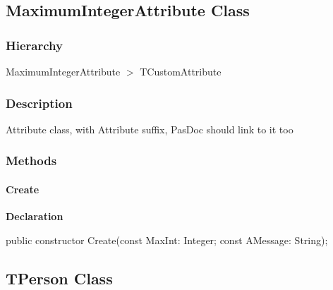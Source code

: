 \documentclass{report}
\newif\ifpdf
\begin{document}
\subsection*{MaximumIntegerAttribute Class}
\fi
\label{ok_attributes.MaximumIntegerAttribute}
\subsubsection*{\large{\textbf{Hierarchy}}\normalsize\hspace{1ex}\hfill}
MaximumIntegerAttribute {$>$} TCustomAttribute
\subsubsection*{\large{\textbf{Description}}\normalsize\hspace{1ex}\hfill}
Attribute class, with Attribute suffix, PasDoc should link to it too\subsubsection*{\large{\textbf{Methods}}\normalsize\hspace{1ex}\hfill}
\paragraph*{Create}\hspace*{\fill}

\label{ok_attributes.MaximumIntegerAttribute-Create}
\begin{list}{}{
\setlength{\itemindent}{0cm}
\setlength{\listparindent}{0cm}
\setlength{\leftmargin}{\evensidemargin}
\addtolength{\leftmargin}{\tmplength}
\settowidth{\labelsep}{X}
\addtolength{\leftmargin}{\labelsep}
\setlength{\labelwidth}{\tmplength}
}
\item[\textbf{Declaration}\hfill]
\ifpdf
\begin{flushleft}
\fi
\begin{ttfamily}
public constructor Create(const MaxInt: Integer; const AMessage: String);\end{ttfamily}

\ifpdf
\end{flushleft}
\fi

\end{list}
\ifpdf
\subsection*{\large{\textbf{TPerson Class}}\normalsize\hspace{1ex}\hrulefill}
\else
\end{document}
